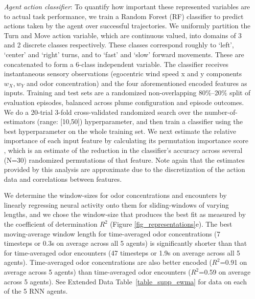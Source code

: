 \documentclass[5p,twocolumn,authoryear]{elsarticle}
\begin{document}
\noindent \textit{Agent action classifier}: To quantify how important these represented variables are to actual task performance, we train a Random Forest (RF) \citep{breiman2001random} classifier to predict actions taken by the agent over successful trajectories.
We uniformly partition the Turn and Move action variable, which are continuous valued, into domains of 3 and 2 discrete classes respectively.
These classes correspond roughly to `left', `center' and `right' turns, and to `fast' and `slow' forward movements.
These are concatenated to form a 6-class independent variable.
The classifier receives instantaneous sensory observations (egocentric wind speed x and y components $w_X, w_Y$ and odor concentration) and the four aforementioned encoded features as inputs. 
Training and test sets are a randomized non-overlapping 80$\%$--20$\%$ split of evaluation episodes, balanced across plume configuration and episode outcomes.
We do a 20-trial 3-fold cross-validated randomized search over the number-of-estimators (range: [10,50]) hyperparameter, and then train a classifier using the best hyperparameter on the whole training set. 
We next estimate the relative importance of each input feature by calculating its permutation importance score \citep{strobl2008conditional, breiman2001random}, which is an estimate of the reduction in the classifier’s accuracy across several (N=30) randomized permutations of that feature.
Note again that the estimates provided by this analysis are approximate due to the discretization of the action data and correlations between features.

We determine the window-sizes \citep{ewma_pandas} for odor concentrations and encounters by linearly regressing neural activity onto them for sliding-windows of varying lengths, and we chose the window-size that produces the best fit as measured by the coefficient of determination $R^2$ (Figure \ref{fig_representations}e).
The best moving-average window length for time-averaged odor concentrations (7 timesteps or 0.3s on average across all 5 agents) is significantly shorter than that for time-averaged odor encounters (47 timesteps or 1.9s on average across all 5 agents). 
Time-averaged odor concentrations are also better encoded ($R^2$=0.91 on average across 5 agents) than time-averaged odor encounters ($R^2$=0.59 on average across 5 agents).
See Extended Data Table~\ref{table_supp_ewma} for data on each of the 5 RNN agents.
\end{document}
